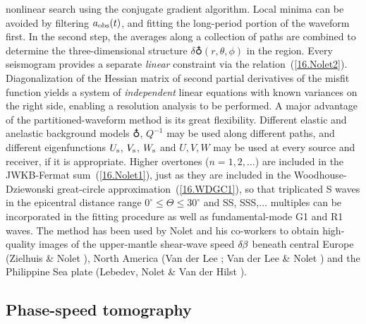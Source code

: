 nonlinear search using the conjugate gradient algorithm.
Local minima can be avoided by filtering $a_{\rm obs}(t)$,
and fitting the long-period portion of the waveform first.
In the second step, the averages along
a collection of paths are combined to
determine the three-dimensional structure
$\delta\earth(r,\theta,\phi)$ in the region.
Every seismogram provides a separate {\em linear\/}
constraint via the relation~(\ref{16.Nolet2}).
Diagonalization of the Hessian matrix of second
partial derivatives of the misfit function
yields a system of {\em independent\/} linear
equations with known variances on the right side,
enabling a resolution analysis to be performed.
A major advantage of the partitioned-waveform
method is its great flexibility.  Different
elastic and anelastic background models
$\earth$, $Q^{-1}$ may be used along
different paths, and different eigenfunctions
$U_{\rm s}$, $V_{\rm s}$, $W_{\rm s}$ and $U,V,W$
may be used at every source and receiver, if it is
appropriate.  Higher overtones ($n=1,2,\ldots$)
are included in the JWKB-Fermat sum~(\ref{16.Nolet1}),
just as they are included in the Woodhouse-Dziewonski
great-circle approximation~(\ref{16.WDGC1}),
so that triplicated S waves in the epicentral
distance range $0^\circ\leq\Theta\leq 30^\circ$
and SS, SSS,\hspace{0.2mm}$\ldots$ multiples can be
incorporated in the fitting procedure as well
as fundamental-mode G1 and R1 waves.
The method has been used by Nolet and his co-workers
to obtain high-quality images of the upper-mantle
shear-wave speed $\delta\hspace{-0.2 mm}\beta$
beneath central Europe (Zielhuis \& Nolet
\citeyear{zielhuis&nolet94}), North
America (Van der Lee \citeyear{vanderlee96};
Van der Lee \& Nolet \citeyear{vanderlee&nolet97})
and the Philippine Sea plate
(Lebedev, Nolet \& Van der Hilst
\citeyear{lebedev&al97}).
%

\subsection{Phase-speed tomography}
%
%
%


